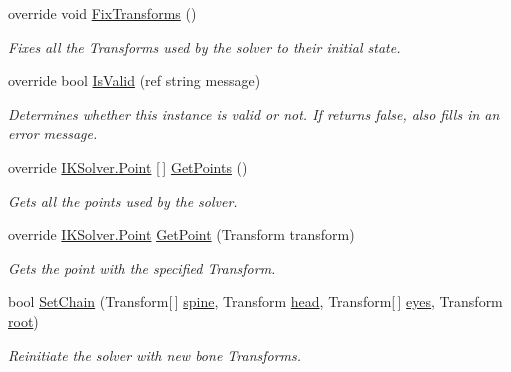 \begin{DoxyCompactItemize}
override void \mbox{\hyperlink{class_root_motion_1_1_final_i_k_1_1_i_k_solver_look_at_afc01280e8f1020cd817748b235f384c4}{Fix\+Transforms}} ()
\begin{DoxyCompactList}\small\item\em Fixes all the Transforms used by the solver to their initial state. \end{DoxyCompactList}\item 
override bool \mbox{\hyperlink{class_root_motion_1_1_final_i_k_1_1_i_k_solver_look_at_ae5ed12132b2966c70cd02055844fe20d}{Is\+Valid}} (ref string message)
\begin{DoxyCompactList}\small\item\em Determines whether this instance is valid or not. If returns false, also fills in an error message. \end{DoxyCompactList}\item 
override \mbox{\hyperlink{class_root_motion_1_1_final_i_k_1_1_i_k_solver_1_1_point}{I\+K\+Solver.\+Point}} \mbox{[}$\,$\mbox{]} \mbox{\hyperlink{class_root_motion_1_1_final_i_k_1_1_i_k_solver_look_at_ac2f6da94b707c8482aced5abc64a341f}{Get\+Points}} ()
\begin{DoxyCompactList}\small\item\em Gets all the points used by the solver. \end{DoxyCompactList}\item 
override \mbox{\hyperlink{class_root_motion_1_1_final_i_k_1_1_i_k_solver_1_1_point}{I\+K\+Solver.\+Point}} \mbox{\hyperlink{class_root_motion_1_1_final_i_k_1_1_i_k_solver_look_at_ad2a93f6d541ff1a901ba93748094ff9b}{Get\+Point}} (Transform transform)
\begin{DoxyCompactList}\small\item\em Gets the point with the specified Transform. \end{DoxyCompactList}\item 
bool \mbox{\hyperlink{class_root_motion_1_1_final_i_k_1_1_i_k_solver_look_at_ac44aa0a9e265f83290333f36def07473}{Set\+Chain}} (Transform\mbox{[}$\,$\mbox{]} \mbox{\hyperlink{class_root_motion_1_1_final_i_k_1_1_i_k_solver_look_at_a856ceade46766c164526b7d3d23e010e}{spine}}, Transform \mbox{\hyperlink{class_root_motion_1_1_final_i_k_1_1_i_k_solver_look_at_a915ee6b32f5db3f0ff7e38b773a8e6ef}{head}}, Transform\mbox{[}$\,$\mbox{]} \mbox{\hyperlink{class_root_motion_1_1_final_i_k_1_1_i_k_solver_look_at_a04b9336c41f6eccfba6c0ab8066ccaca}{eyes}}, Transform \mbox{\hyperlink{class_root_motion_1_1_final_i_k_1_1_i_k_solver_add558b38f163259934c37a0f1b497c06}{root}})
\begin{DoxyCompactList}\small\item\em Reinitiate the solver with new bone Transforms. \end{DoxyCompactList}\end{DoxyCompactItemize}
